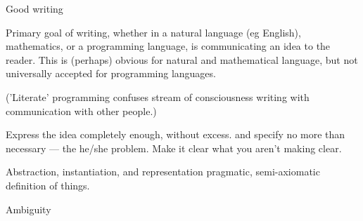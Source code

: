 \begin{plSection}{Good writing}

Primary goal of writing, whether in a natural language (eg
English), mathematics, or a programming language, is communicating
an idea to the reader.
This is (perhaps) obvious for natural and mathematical language,
but not universally accepted for programming languages.


('Literate' programming confuses stream of consciousness writing
with communication with other people.)

Express the idea completely enough, without excess.
and specify no more than
necessary --- the he/she problem.
Make it clear what you aren't making clear.
\begin{plSection}{Abstraction, instantiation, and representation}
pragmatic, semi-axiomatic definition of things.
\end{plSection}
\begin{plSection}{Ambiguity}
\end{plSection}
\end{plSection}
